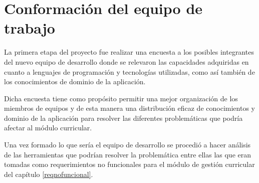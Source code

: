 \section{Conformación del equipo de trabajo} \label{analisis_herramientas}
La primera etapa del proyecto fue realizar una encuesta a los posibles integrantes del nuevo equipo de desarrollo donde se relevaron las capacidades adquiridas en cuanto a lenguajes de programación y tecnologías utilizadas, como así también de los conocimientos de dominio de la aplicación.

Dicha encuesta tiene como propósito permitir una mejor organización de los miembros de equipos y de esta manera una distribución eficaz de conocimientos y dominio de la aplicación para resolver las diferentes problemáticas que podría afectar al módulo curricular.

Una vez formado lo que sería el equipo de desarrollo se procedió a hacer análisis de las herramientas que podrían resolver la problemática entre ellas las que eran tomadas como requerimientos no funcionales para el módulo de gestión curricular del capítulo \ref{reqnofuncional}.